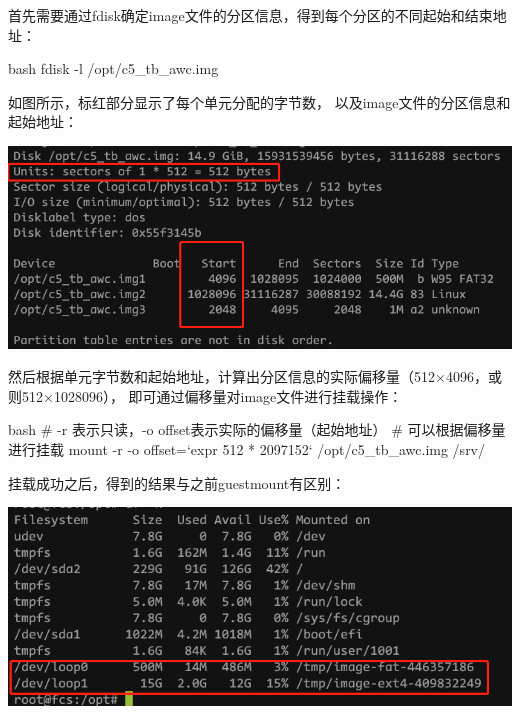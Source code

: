 \begin{outline}[enumerate]
首先需要通过fdisk确定image文件的分区信息，得到每个分区的不同起始和结束地址：
\begin{code-block}{bash}
fdisk -l /opt/c5_tb_awc.img
\end{code-block}

如图所示，标红部分显示了每个单元分配的字节数，
以及image文件的分区信息和起始地址：
\par\begin{minipage}{\linewidth}
  \centering
  \includegraphics[width=\linewidth]{imagefile.png}
  \label{fig:imagefile}
\end{minipage}

然后根据单元字节数和起始地址，计算出分区信息的实际偏移量（512×4096，或则512×1028096），
即可通过偏移量对image文件进行挂载操作：
\begin{code-block}{bash}
# -r 表示只读，-o offset表示实际的偏移量（起始地址）
# 可以根据偏移量进行挂载
mount -r -o offset=`expr 512 * 2097152` /opt/c5_tb_awc.img /srv/
\end{code-block}

挂载成功之后，得到的结果与之前guestmount有区别：
\par\begin{minipage}{\linewidth}
  \centering
  \includegraphics[width=\linewidth]{offset_mount.png}
  \label{fig:offset_mount}
\end{minipage}


\end{outline}
